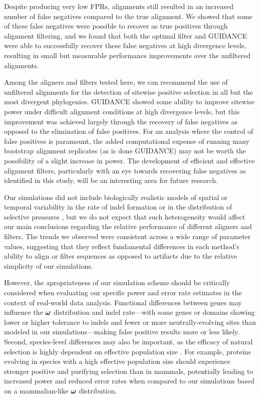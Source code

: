 \documentclass{mbe}
\begin{document}
Despite producing very low FPRs, \prankc alignments still resulted in
an increased number of false negatives compared to the true
alignment. We showed that some of these false negatives were possible
to recover as true positives through alignment filtering, and we found
that both the optimal filter and GUIDANCE were able to successfully
recover these false negatives at high divergence levels, resulting in
small but measurable performance improvements over the unfiltered
\prankc alignments.

Among the aligners and filters tested here, we can recommend the use
of unfiltered \prankc alignments for the detection of sitewise
positive selection in all but the most divergent phylogenies. GUIDANCE
showed some ability to improve sitewise power under difficult
alignment conditions at high divergence levels, but this improvement
was achieved largely through the recovery of false negatives as
opposed to the elimination of false positives. For an analysis where
the control of false positives is paramount, the added computational
expense of running many bootstrap alignment replicates (as is done
GUIDANCE) may not be worth the possibility of a slight increase in
power. The development of efficient and effective alignment filters,
particularly with an eye towards recovering false negatives as
identified in this study, will be an interesting area for future
research.

Our simulations did not include biologically realistic models of
spatial or temporal variability in the rate of indel formation or in
the distribution of selective pressures \citep{Whelan2008Spatial}, but
we do not expect that such heterogeneity would affect our main
conclusions regarding the relative performance of different aligners
and filters. The trends we observed were consistent across a wide
range of parameter values, suggesting that they reflect fundamental
differences in each method's ability to align or filter sequences as
opposed to artifacts due to the relative simplicity of our
simulations.

However, the apropriateness of our simulation scheme should be
critically considered when evaluating our specific power and error
rate estimates in the context of real-world data analysis. Functional
differences between genes may influence the $\bm{\omega}$ distribution and
indel rate---with some genes or domains showing lower or higher
tolerance to indels and fewer or more neutrally-evolving sites than
modeled in our simulations---making false positive results more or
less likely. Second, species-level differences may also be important,
as the efficacy of natural selection is highly dependent on effective
population size \citep{Ellegren2009Selection}. For example, proteins
evolving in \Dr species with a high effective population size should
experience stronger positive and purifying selection than in mammals,
potentially leading to increased power and reduced error rates when
compared to our simulations based on a mammalian-like $\bm{\omega}$
distribution.
\end{document}
